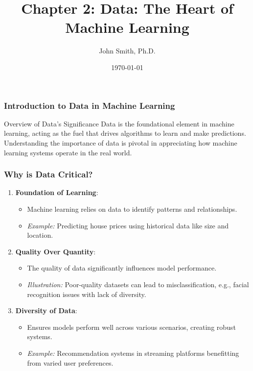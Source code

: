 \documentclass[aspectratio=169]{beamer}
\title[Chapter 2: Data]{Chapter 2: Data: The Heart of Machine Learning}
\author[J. Smith]{John Smith, Ph.D.}
\institute[University Name]{
  Department of Computer Science\\
  University Name\\
  \vspace{0.3cm}
  Email: email@university.edu\\
  Website: www.university.edu
}
\date{\today}
\begin{document}
\frame{\titlepage}

\begin{frame}[fragile]
    \frametitle{Introduction to Data in Machine Learning}
    \begin{block}{Overview of Data's Significance}
        Data is the foundational element in machine learning, acting as the fuel that drives algorithms to learn and make predictions. Understanding the importance of data is pivotal in appreciating how machine learning systems operate in the real world.
    \end{block}
\end{frame}

\begin{frame}[fragile]
    \frametitle{Why is Data Critical?}
    \begin{enumerate}
        \item \textbf{Foundation of Learning}:
        \begin{itemize}
            \item Machine learning relies on data to identify patterns and relationships.
            \item \textit{Example:} Predicting house prices using historical data like size and location.
        \end{itemize}
        
        \item \textbf{Quality Over Quantity}:
        \begin{itemize}
            \item The quality of data significantly influences model performance.
            \item \textit{Illustration:} Poor-quality datasets can lead to misclassification, e.g., facial recognition issues with lack of diversity.
        \end{itemize}
        
        \item \textbf{Diversity of Data}:
        \begin{itemize}
            \item Ensures models perform well across various scenarios, creating robust systems.
            \item \textit{Example:} Recommendation systems in streaming platforms benefitting from varied user preferences.
        \end{itemize}
    \end{enumerate}
\end{frame}
\end{document}
